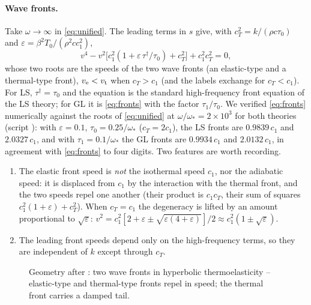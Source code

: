 \paragraph{Wave fronts.} Take $\omega\to\infty$ in \eqref{eq:unified}. The leading terms in $s$ give, with $c_T^2=k/(\rho c\tau_0)$ and $\varepsilon=\beta^2T_0/(\rho^2cc_1^2)$,
\begin{equation}
v^4-v^2\bigl[c_1^2(1+\varepsilon\,\tau^\dagger/\tau_0)+c_T^2\bigr]+c_1^2c_T^2=0, \label{eq:fronts}
\end{equation}
whose two roots are the speeds of the two wave fronts (an elastic-type and a thermal-type front), $v_{\rm e}<v_{\rm t}$ when $c_T>c_1$ (and the labels exchange for $c_T<c_1$). For LS, $\tau^\dagger=\tau_0$ and the equation is the standard high-frequency front equation of the LS theory; for GL it is \eqref{eq:fronts} with the factor $\tau_1/\tau_0$. We verified \eqref{eq:fronts} numerically against the roots of \eqref{eq:unified} at $\omega/\omega_*=2\times10^3$ for both theories (script ): with $\varepsilon=0.1$, $\tau_0=0.25/\omega_*$ ($c_T=2c_1$), the LS fronts are $0.9839\,c_1$ and $2.0327\,c_1$, and with $\tau_1=0.1/\omega_*$ the GL fronts are $0.9934\,c_1$ and $2.0132\,c_1$, in agreement with \eqref{eq:fronts} to four digits. Two features are worth recording.
\begin{enumerate}
\item The elastic front speed is \emph{not} the isothermal speed $c_1$, nor the adiabatic speed: it is displaced from $c_1$ by the interaction with the thermal front, and the two speeds repel one another (their product is $c_1c_T$, their sum of squares $c_1^2(1+\varepsilon)+c_T^2$). When $c_T=c_1$ the degeneracy is lifted by an amount proportional to $\sqrt\varepsilon$: $v^2=c_1^2[2+\varepsilon\pm\sqrt{\varepsilon(4+\varepsilon)}]/2\approx c_1^2(1\pm\sqrt\varepsilon)$.
\item The leading front speeds depend only on the high-frequency terms, so they are independent of $k$ except through $c_T$.
\end{enumerate}

\begin{figure}[t!]\centering\small

\caption{Geometry after \citep{Lord1967}: two wave fronts in hyperbolic thermoelasticity -- elastic-type and thermal-type fronts repel in speed; the thermal front carries a damped tail.}\label{fig:fronts}
\end{figure}

